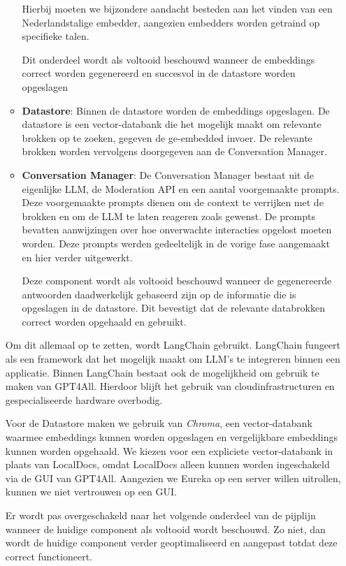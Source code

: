 \begin{enumerate}
\begin{itemize}
        Hierbij moeten we bijzondere aandacht besteden aan het vinden van een Nederlandstalige embedder, aangezien embedders worden getraind op specifieke talen.

        Dit onderdeel wordt als voltooid beschouwd wanneer de embeddings correct worden gegenereerd en succesvol in de datastore worden opgeslagen
        \item \textbf{Datastore}: Binnen de datastore worden de embeddings opgeslagen. De datastore is een vector-databank die het mogelijk maakt om relevante brokken op te zoeken, gegeven de ge-embedded invoer. De relevante brokken worden vervolgens doorgegeven aan de Conversation Manager. 
        \item \textbf{Conversation Manager}: De Conversation Manager bestaat uit de eigenlijke \acrshort{LLM}, de Moderation API en een aantal voorgemaakte prompts. Deze voorgemaakte prompts dienen om de context te verrijken met de brokken en om de \acrshort{LLM} te laten reageren zoals gewenst. De prompts bevatten aanwijzingen over hoe onverwachte interacties opgelost moeten worden. Deze prompts werden gedeeltelijk in de vorige fase aangemaakt en hier verder uitgewerkt. 
        
        Deze component wordt als voltooid beschouwd wanneer de gegenereerde antwoorden daadwerkelijk gebaseerd zijn op de informatie die is opgeslagen in de datastore. Dit bevestigt dat de relevante databrokken correct worden opgehaald en gebruikt.
    \end{itemize}
    
    Om dit allemaal op te zetten, wordt LangChain gebruikt. LangChain fungeert als een framework dat het mogelijk maakt om \acrshort{LLM}'s te integreren binnen een applicatie. Binnen LangChain bestaat ook de mogelijkheid om gebruik te maken van GPT4All. Hierdoor blijft het gebruik van cloudinfrastructuren en gespecialiseerde hardware overbodig.
    
    Voor de Datastore maken we gebruik van \emph{Chroma}, een vector-databank waarmee embeddings kunnen worden opgeslagen en vergelijkbare embeddings kunnen worden opgehaald. We kiezen voor een expliciete vector-databank in plaats van LocalDocs, omdat LocalDocs alleen kunnen worden ingeschakeld via de GUI van GPT4All. Aangezien we Eureka op een server willen uitrollen, kunnen we niet vertrouwen op een GUI.
    
    Er wordt pas overgeschakeld naar het volgende onderdeel van de pijplijn wanneer de huidige component als voltooid wordt beschouwd. Zo niet, dan wordt de huidige component verder geoptimaliseerd en aangepast totdat deze correct functioneert.
    

\end{enumerate}
